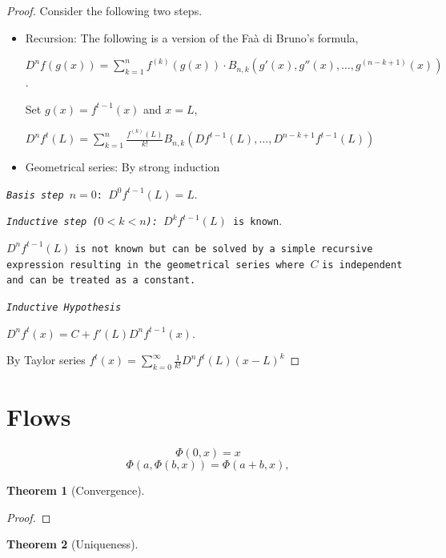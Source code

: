\documentclass{article}
\newtheorem{theorem}{Theorem}
\theoremstyle{definition}
\begin{document}
\begin{proof} Consider the following two steps.

\begin{itemize}
\item Recursion:
The following is a version of the Faà di Bruno's formula, \cite{weisstein}

${D^n} f(g(x)) = \sum_{k=1}^n f^{(k)}(g(x))\cdot B_{n,k}\left(g'(x),g''(x),\dots,g^{(n-k+1)}(x)\right)$.

Set $g(x)=f^{t-1}(x)$ and $x=L$,

$D^nf^t(L)=\sum_{k=1}^n \frac{f^{(k)}(L)}{k!} B_{n,k}(Df^{t-1}(L),\ldots, D^{n-k+1}f^{t-1}(L))$

    \item Geometrical series: By strong induction

\end{itemize}

\texttt{\emph{Basis step $n=0$}: $D^0f^{t-1}(L)=L$}.

\texttt{\emph{Inductive step ($0<k<n$):} $D^kf^{t-1}(L)$ is known}.

 $D^nf^{t-1}(L)$ \texttt{is not known but can be solved by a simple recursive expression resulting in the geometrical series where }$C$ \texttt{is independent and can be treated as a constant.}

\texttt{\emph{Inductive Hypothesis}}

$D^nf^t(x)=C+f'(L)D^nf^{t-1}(x)$.

By Taylor series $f^t(x)=\sum_{k=0}^\infty\frac{1}{k!} D^nf^t(L) (x - L)^k$
\end{proof}

\section{Flows}

$$\Phi(0,x) = x$$
$$\Phi(a,\Phi(b,x)) = \Phi(a+b, x),$$

\begin{theorem}[Convergence]

\end{theorem}

\begin{proof}

\end{proof}

\begin{theorem}[Uniqueness]

\end{theorem}
\end{document}
